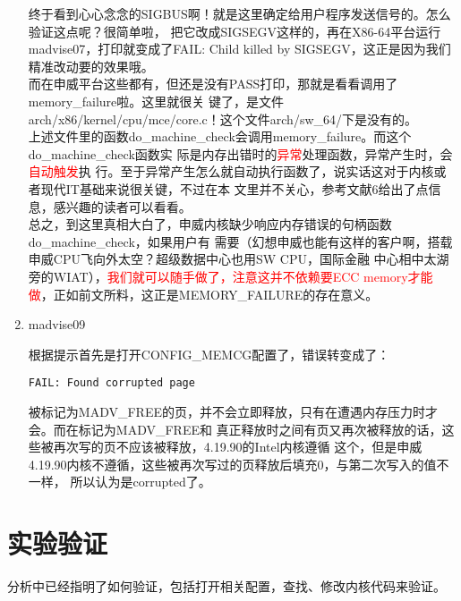 \documentclass[scheme=plain]{ctexart}
\begin{document}
\begin{enumerate}
  终于看到心心念念的SIGBUS啊！就是这里确定给用户程序发送信号的。怎么验证这点呢？很简单啦，
  把它改成SIGSEGV这样的，再在X86-64平台运行madvise07，打印就变成了FAIL: Child killed by
  SIGSEGV，这正是因为我们精准改动要的效果哦。\\

  而在申威平台这些都有，但还是没有PASS打印，那就是看看调用了memory\_failure啦。这里就很关
  键了，是文件arch/x86/kernel/cpu/mce/core.c！这个文件arch/sw\_64/下是没有的。\\

  上述文件里的函数do\_machine\_check会调用memory\_failure。而这个do\_machine\_check函数实
  际是内存出错时的\textcolor{red}{异常}处理函数，异常产生时，会\textcolor{red}{自动触发}执
  行。至于异常产生怎么就自动执行函数了，说实话这对于内核或者现代IT基础来说很关键，不过在本
  文里并不关心，参考文献6给出了点信息，感兴趣的读者可以看看。\\

  总之，到这里真相大白了，申威内核缺少响应内存错误的句柄函数do\_machine\_check，如果用户有
  需要（幻想申威也能有这样的客户啊，搭载申威CPU飞向外太空？超级数据中心也用SW CPU，国际金融
  中心相中太湖旁的WIAT），\textcolor{red}{我们就可以随手做了，注意这并不依赖要ECC memory才能
    做}，正如前文所料，这正是MEMORY\_FAILURE的存在意义。
    
\item madvise09

  根据提示首先是打开CONFIG\_MEMCG配置了，错误转变成了：
\begin{verbatim}
FAIL: Found corrupted page
\end{verbatim}

  被标记为MADV\_FREE的页，并不会立即释放，只有在遭遇内存压力时才会。而在标记为MADV\_FREE和
  真正释放时之间有页又再次被释放的话，这些被再次写的页不应该被释放，4.19.90的Intel内核遵循
  这个，但是申威4.19.90内核不遵循，这些被再次写过的页释放后填充0，与第二次写入的值不一样，
  所以认为是corrupted了。
  
\end{enumerate}

\section{实验验证}
\label{sec:syyz}
分析中已经指明了如何验证，包括打开相关配置，查找、修改内核代码来验证。
\end{document}
